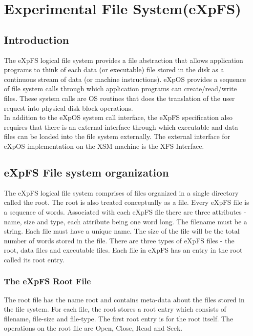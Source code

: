 \chapter{Experimental File System(eXpFS)}
\label{chap3}
\section{Introduction}
 
The eXpFS logical file system provides a file abstraction that allows application programs to think of each data (or executable) file stored in the disk as a continuous stream of data (or machine instructions). eXpOS provides a sequence of file system calls through which application programs can create/read/write files. These system calls are OS routines that does the translation of the user request into physical disk block operations.
\\

In addition to the eXpOS system call interface, the eXpFS specification also requires that there is an external interface through which executable and data files can be loaded into the file system externally. The external interface for eXpOS implementation on the XSM machine is the XFS Interface.
\\

\section{eXpFS File system organization}
The eXpFS logical file system comprises of files organized in a single directory called the root. The root is also treated conceptually as a file. Every eXpFS file is a sequence of words. Associated with each eXpFS file there are three attributes - name, size and type, each attribute being one word long. The filename must be a string. Each file must have a unique name. The size of the file will be the total number of words stored in the file. There are three types of eXpFS files - the root, data files and executable files. Each file in eXpFS has an entry in the root called its root entry. 

\subsection{The eXpFS Root File}
The root file has the name root and contains meta-data about the files stored in the file system. For each file, the root stores a root entry which consists of filename, file-size and file-type. The first root entry is for the root itself. The operations on the root file are Open, Close, Read and Seek. 

